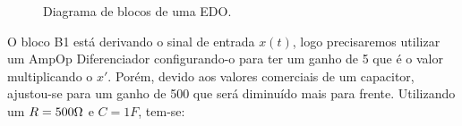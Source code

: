 \begin{figure}[H]
    \centering
    \caption{Diagrama de blocos de uma EDO.}
    \label{fig:diagrama_edo}
\end{figure}


O bloco B1 está derivando o sinal de entrada $x(t)$, logo precisaremos utilizar um AmpOp Diferenciador configurando-o para ter um ganho de 5 que é o valor multiplicando o $x'$. Porém, devido aos valores comerciais de um capacitor, ajustou-se para um ganho de 500 que será diminuído mais para frente. Utilizando um $R=500\ohm$ e $C=1F$, tem-se:

